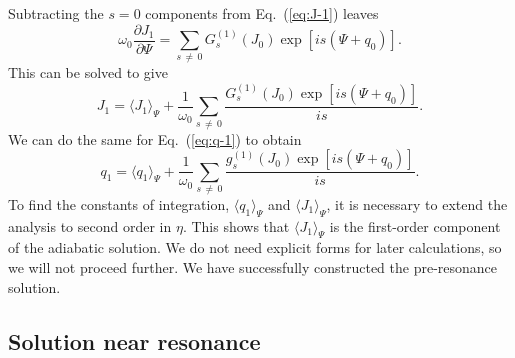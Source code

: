 \documentclass[aps,prd,amsfonts,amssymb,amsmath,nofootinbib,showpacs,superscriptaddress,twocolumn,floatfix]{revtex4-1}
\newcommand{\eqnref}[1]{Eq.~(\ref{eq:#1})}
\newcommand{\partialdiff}[2]{\ensuremath{\dfrac{\partial {#1}}{\partial {#2}}}}
\newcommand{\recip}[1]{\ensuremath{\frac{1}{#1}}}
\begin{document}
Subtracting the $s = 0$ components from \eqnref{J-1} leaves
\begin{equation}
\omega_0\partialdiff{J_1}{\Psi} = \sum_{s\,\neq\,0} G_s^{(1)}(J_0)\exp\left[is(\Psi + q_0)\right].
\end{equation}
This can be solved to give
\begin{equation}
J_1 = \langle J_1\rangle_\Psi + \recip{\omega_0}\sum_{s\,\neq\,0} \dfrac{G_s^{(1)}(J_0)\exp\left[is(\Psi + q_0)\right]}{is}.
\label{eq:J-1-sol}
\end{equation}
We can do the same for \eqnref{q-1} to obtain
\begin{equation}
q_1 = \langle q_1\rangle_\Psi + \recip{\omega_0}\sum_{s\,\neq\,0} \dfrac{g_s^{(1)}(J_0)\exp\left[is(\Psi + q_0)\right]}{is}.
\label{eq:q-1-sol}
\end{equation}
To find the constants of integration, $\langle q_1\rangle_\Psi$ and $\langle J_1\rangle_\Psi$, it is necessary to extend the analysis to second order in $\eta$. This shows that $\langle J_1\rangle_\Psi$ is the first-order component of the adiabatic solution. We do not need explicit forms for later calculations, so we will not proceed further. We have successfully constructed the pre-resonance solution.

\subsection{Solution near resonance}\label{sec:interior-res}
\end{document}
